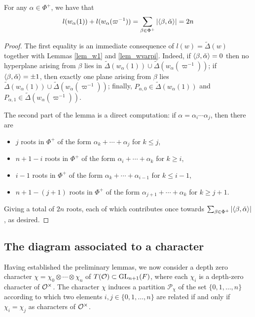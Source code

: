     \begin{cor}\label{cor_lengthsum}
        For any $\alpha\in\Phi^+$, we have that 
        $$l(w_\alpha(1))+l(w_\alpha(\varpi^{-1}))=\sum_{\beta\in\Phi^+}|\langle\beta,\check{\alpha}\rangle|=2n$$
    \end{cor}
    \begin{proof}
        The first equality is an immediate consequence of $l(w)=\widetilde{\Delta}(w)$ together with Lemmas \ref{lem_w1} and \ref{lem_wvarpi}. Indeed, if $\langle\beta,\check{\alpha}\rangle=0$ then no hyperplane arising from $\beta$ lies in $\widetilde{\Delta}(w_\alpha(1))\cup\widetilde{\Delta}(w_\alpha(\varpi^{-1}))$; if $\langle\beta,\check{\alpha}\rangle=\pm1$, then exactly one plane arising from $\beta$ lies $\widetilde{\Delta}(w_\alpha(1))\cup\widetilde{\Delta}(w_\alpha(\varpi^{-1}))$; finally, $P_{\alpha,0}\in \widetilde{\Delta}(w_\alpha(1))$ and $P_{\alpha,1}\in \widetilde{\Delta}(w_\alpha(\varpi^{-1}))$.

        The second part of the lemma is a direct computation: if $\alpha=\alpha_i\cdots\alpha_j$, then there are 
        \begin{itemize}
            \item $j$ roots in $\Phi^+$ of the form $\alpha_k+\cdots+\alpha_j$ for $k\leq j$,
            \item $n+1-i$ roots in $\Phi^+$ of the form $\alpha_i+\cdots+\alpha_k$ for $k\geq i$,
            \item $i-1$ roots in $\Phi^+$ of the form $\alpha_k+\cdots+\alpha_{i-1}$ for $k\leq i-1$,
            \item $n+1-(j+1)$ roots in $\Phi^+$ of the form $\alpha_{j+1}+\cdots+\alpha_k$ for $k\geq j+1$.
        \end{itemize}
        Giving a total of $2n$ roots, each of which contributes once towards $\sum_{\beta\in\Phi^+}|\langle\beta,\check{\alpha}\rangle|$, as desired.
    \end{proof}

    \subsection{The diagram associated to a character}
    Having established the preliminary lemmas, we now consider a depth zero character $\chi=\chi_0\otimes\cdots\otimes\chi_n$ of $T(\mathcal{O})\subset\mathrm{GL}_{n+1}(F)$, where each $\chi_i$ is a depth-zero character of $\mathcal{O}^\times$. The character $\chi$ induces a partition $\mathcal{P}_\chi$ of the set $\{0,1,\ldots,n\}$ according to which two elements $i,j\in\{0,1,\ldots,n\}$ are related if and only if $\chi_i=\chi_j$ as characters of $\mathcal{O}^\times$. 
    
